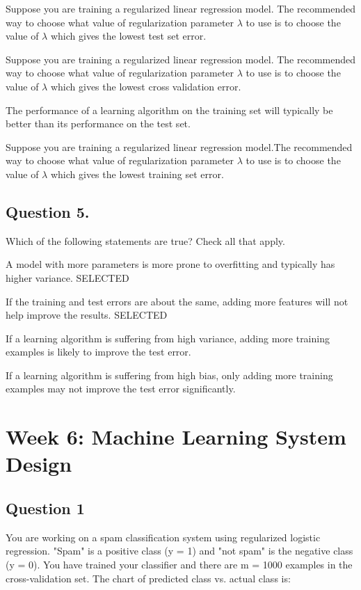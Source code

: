 \documentclass[11pt]{article} %
\begin{document}
Suppose you are training a regularized linear regression model. The recommended way to choose what value of regularization parameter $\lambda$ to use is to choose the value of $\lambda$ which gives the lowest test set error.

Suppose you are training a regularized linear regression model. The recommended way to choose what value of regularization parameter $\lambda$ to use is to choose the value of $\lambda$ which gives the lowest cross validation error.

The performance of a learning algorithm on the training set will typically be better than its performance on the test set.

Suppose you are training a regularized linear regression model.The recommended way to choose what value of regularization parameter $\lambda$ to use is to choose the value of $\lambda$ which gives the lowest training set error.

\subsection*{Question 5. }
Which of the following statements are true? Check all that apply.

A model with more parameters is more prone to overfitting and typically has higher variance. SELECTED

If the training and test errors are about the same, adding more features will not help improve the results. SELECTED

If a learning algorithm is suffering from high variance, adding more training examples is likely to improve the test error.

If a learning algorithm is suffering from high bias, only adding more training examples may not improve the test error significantly.

\newpage
\section*{Week 6: Machine Learning System Design}

\subsection*{Question 1} 
You are working on a spam classification system using regularized logistic regression. "Spam" is a positive class (y = 1) and "not spam" is the negative class (y = 0). You have trained your classifier and there are m = 1000 examples in the cross-validation set. The chart of predicted class vs. actual class is:
\end{document}
